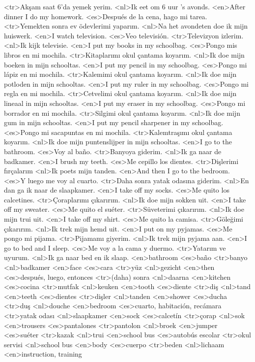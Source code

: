 <tr>Akşam saat 6’da yemek yerim.
<nl>Ik eet om 6 uur 's avonds.
<en>After dinner I do my homework.
<es>Después de la cena, hago mi tarea.
<tr>Yemekten sonra ev ödevlerimi yaparım.
<nl>Na het avondeten doe ik mijn huiswerk.
<en>I watch television.
<es>Veo televisión.
<tr>Televizyon izlerim.
<nl>Ik kijk televisie.
<en>I put my books in my schoolbag.
<es>Pongo mis libros en mi mochila.
<tr>Kitaplarımı okul çantama koyarım.
<nl>Ik doe mijn boeken in mijn schooltas.
<en>I put my pencil in my schoolbag.
<es>Pongo mi lápiz en mi mochila.
<tr>Kalemimi okul çantama koyarım.
<nl>Ik doe mijn potloden in mijn schooltas.
<en>I put my ruler in my schoolbag.
<es>Pongo mi regla en mi mochila.
<tr>Cetvelimi okul çantama koyarım.
<nl>Ik doe mijn lineaal in mijn schooltas.
<en>I put my eraser in my schoolbag.
<es>Pongo mi borrador en mi mochila.
<tr>Silgimi okul çantama koyarım.
<nl>Ik doe mijn gum in mijn schooltas.
<en>I put my pencil sharpener in my schoolbag.
<es>Pongo mi sacapuntas en mi mochila.
<tr>Kalemtraşımı okul çantama koyarım.
<nl>Ik doe mijn puntenslijper in mijn schooltas.
<en>I go to the bathroom.
<es>Voy al baño.
<tr>Banyoya giderim.
<nl>Ik ga naar de badkamer.
<en>I brush my teeth.
<es>Me cepillo los dientes.
<tr>Dişlerimi fırçalarım
<nl>Ik poets mijn tanden.
<en>And then I go to the bedroom.
<es>Y luego me voy al cuarto.
<tr>Daha sonra yatak odasına giderim.
<nl>En dan ga ik naar de slaapkamer.
<en>I take off my socks.
<es>Me quito los calcetines.
<tr>Çoraplarımı çıkarırım.
<nl>Ik doe mijn sokken uit.
<en>I take off my sweater.
<es>Me quito el suéter.
<tr>Süveterimi çıkarırım.
<nl>Ik doe mijn trui uit.
<en>I take off my shirt.
<es>Me quito la camisa.
<tr>Göleğimi çıkarırım.
<nl>Ik trek mijn hemd uit.
<en>I put on my pyjamas.
<es>Me pongo mi pijama.
<tr>Pijamamı giyerim.
<nl>Ik trek mijn pyjama aan.
<en>I go to bed and I sleep.
<es>Me voy a la cama y duermo.
<tr>Yatarım ve uyurum.
<nl>Ik ga naar bed en ik slaap.
<en>bathroom
<es>baño
<tr>banyo
<nl>badkamer
<en>face
<es>cara
<tr>yüz
<nl>gezicht
<en>then
<es>después, luego, entonces
<tr>(daha) sonra
<nl>daarna
<en>kitchen
<es>cocina
<tr>mutfak
<nl>keuken
<en>tooth
<es>diente
<tr>diş
<nl>tand
<en>teeth
<es>dientes
<tr>dişler
<nl>tanden
<en>shower
<es>ducha
<tr>duş
<nl>douche
<en>bedroom
<es>cuarto, habitación, recámara
<tr>yatak odası
<nl>slaapkamer
<en>sock
<es>calcetín
<tr>çorap
<nl>sok
<en>trousers
<es>pantalones
<tr>pantolon
<nl>broek
<en>jumper
<es>suéter
<tr>kazak
<nl>trui
<en>school bus
<es>autobús escolar
<tr>okul servisi
<nl>school bus
<en>body
<es>cuerpo
<tr>beden
<nl>lichaam
<en>instruction, training
